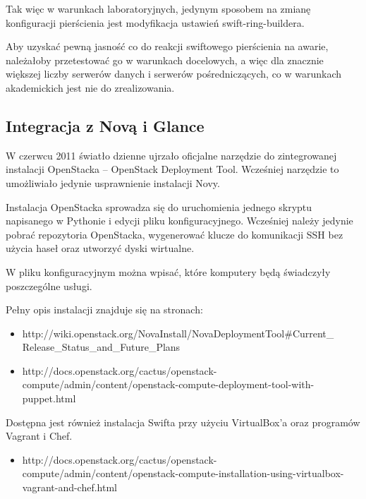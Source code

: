 \documentclass[12pt]{article}
\begin{document}
Tak więc w warunkach laboratoryjnych, jedynym sposobem na zmianę konfiguracji pierścienia jest modyfikacja ustawień swift-ring-buildera.

Aby uzyskać pewną jasność co do reakcji swiftowego pierścienia na awarie, należałoby przetestować go w warunkach docelowych, a więc dla znacznie większej liczby serwerów danych i serwerów pośredniczących, co w warunkach akademickich jest nie do zrealizowania.

\subsection{Integracja z Novą i Glance}

W czerwcu 2011 światło dzienne ujrzało oficjalne narzędzie do zintegrowanej instalacji OpenStacka – OpenStack Deployment Tool. Wcześniej narzędzie to umożliwiało jedynie usprawnienie instalacji Novy.

Instalacja OpenStacka sprowadza się do uruchomienia jednego skryptu napisanego w Pythonie i edycji pliku konfiguracyjnego. Wcześniej należy jedynie pobrać repozytoria OpenStacka, wygenerować klucze do komunikacji SSH bez użycia haseł oraz utworzyć dyski wirtualne.

W pliku konfiguracyjnym można wpisać, które komputery będą świadczyły poszczególne usługi. 

Pełny opis instalacji znajduje się na stronach:

\begin{itemize}
\item http://wiki.openstack.org/NovaInstall/NovaDeploymentTool\#Current\_
Release\_Status\_and\_Future\_Plans
\item http://docs.openstack.org/cactus/openstack-compute/admin/content/openstack-compute-deployment-tool-with-puppet.html
\end{itemize}

Dostępna jest również instalacja Swifta przy użyciu VirtualBox’a oraz programów Vagrant i Chef.

\begin{itemize}
\item http://docs.openstack.org/cactus/openstack-compute/admin/content/openstack-compute-installation-using-virtualbox-vagrant-and-chef.html
\end{itemize}
\end{document}
